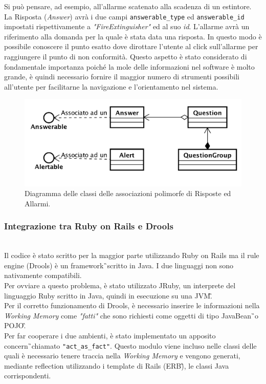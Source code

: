 Si può pensare, ad esempio, all'allarme scatenato alla scadenza di un estintore. \\
La Risposta (\textit{Answer}) avrà i due campi \texttt{answerable\_type} ed \texttt{answerable\_id} impostati rispettivamente a \textit{"FireExtinguisher"} ed al suo \textit{id}.  L'allarme avrà un riferimento alla domanda per la quale è stata data una risposta. In questo modo è possibile conoscere il punto esatto dove dirottare l'utente al click sull'allarme per raggiungere il punto di non conformità. Questo aspetto è stato considerato di fondamentale importanza poiché la mole delle informazioni nel software è molto grande, è quindi necessario fornire il maggior numero di strumenti possibili all'utente per facilitarne la navigazione e l'orientamento nel sistema.
\begin{figure}[H]
	\begin{center}
		\includegraphics[width=14cm]{Pics/diagramma_classi_associazioni_polimorfe.png}
		\caption{Diagramma delle classi delle associazioni polimorfe di Risposte ed Allarmi.}
		\label{fig:DiagrammaClassiAssociazioniPolimorfe}
	\end{center}
\end{figure}

\subsubsection{Integrazione tra Ruby on Rails e Drools}\mbox{} \\

Il codice è stato scritto per la maggior parte utilizzando Ruby on Rails ma il rule engine (Drools) è un \gls{framework}\G\ scritto in Java. I due linguaggi non sono nativamente compatibili. \\
Per ovviare a questo problema, è stato utilizzato JRuby, un interprete del linguaggio Ruby scritto in Java, quindi in esecuzione su una \gls{JVM}\G. \\
Per il corretto funzionamento di Drools, è necessario inserire le informazioni nella \textit{Working Memory} come \textit{"fatti"} che sono richiesti come oggetti di tipo \gls{JavaBean}\G\ o \gls{POJO}\G.\\
Per far cooperare i due ambienti, è stato implementato un apposito \gls{concern}\G\ chiamato \texttt{"act\_as\_fact"}. Questo modulo viene incluso nelle classi delle quali è necessario tenere traccia nella \textit{Working Memory} e vengono generati, mediante \gls{reflection} utilizzando i template di Rails (\gls{ERB}\G), le classi Java corrispondenti.


